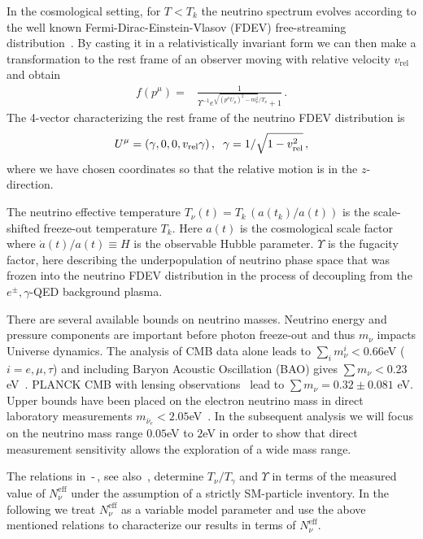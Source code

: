 In the cosmological setting, for $T<T_k$ the neutrino spectrum evolves according to the well known Fermi-Dirac-Einstein-Vlasov (FDEV) free-streaming distribution~\cite{Langacker:1982ih,Choquet-Bruhat:2009xil,Wong:2011ip,Birrell:2012gg}.  By casting it in a relativistically invariant form we can then make a transformation to the rest frame of an observer moving with relative velocity $v_{\text{rel}}$ and obtain
\begin{align}\label{eq:neutrinoDistB}
f(p^\mu)=&\frac{1}{\Upsilon^{-1} e^{\sqrt{(p^\mu U_\mu)^2-m_\nu^2}/T_\nu}+1}\,.
\end{align}
The 4-vector characterizing the rest frame of the neutrino FDEV distribution is
\begin{equation}
U^\mu=(\gamma,0,0,v_{\text{rel}}\gamma)\,,\hspace{2mm} \gamma={1}/{\sqrt{1-v_{\text{rel}}^2}}\,,
\end{equation} 
where we have chosen coordinates so that the relative motion is in the $z$-direction. 

The neutrino effective temperature $T_\nu(t)= T_k\,(a(t_k)/a(t))$ is the scale-shifted freeze-out temperature $T_k$. Here $a(t)$ is the cosmological scale factor where $\dot a(t)/a(t)\equiv H$ is the observable Hubble parameter. $\Upsilon$ is the fugacity factor, here describing the underpopulation of neutrino phase space that was frozen into the neutrino FDEV distribution in the process of decoupling from the $e^\pm,\gamma$-QED background  plasma.

There are several available bounds on neutrino masses. Neutrino energy and pressure components are important before photon freeze-out and thus $m_\nu$ impacts Universe dynamics. The analysis of CMB data alone leads to $\sum_i m_\nu^i<0.66$eV ($i=e,\mu,\tau$) and including Baryon Acoustic Oscillation (BAO) gives $\sum m_\nu<0.23$eV~\cite{Planck:2013pxb}.  {\small PLANCK CMB} with lensing observations~\cite{Battye:2013xqa} lead to  $\sum m_{\nu}=0.32\pm0.081$ eV. Upper bounds have been placed on the electron neutrino mass in direct laboratory measurements  $m_{\bar\nu_e}<2.05$eV~\cite{Troitsk:2011cvm}.   In the subsequent analysis we will focus on the neutrino mass range $0.05$eV to $2$eV in order to show that direct measurement sensitivity allows the exploration of a wide mass range. 

 The relations in \,-\,, see also~\cite{Birrell:2012gg}, determine $T_\nu/T_\gamma$ and  $\Upsilon$ in terms of the measured  value of  $N_\nu^{\mathrm{eff}}$ under the assumption of a strictly SM-particle inventory.  In the following we treat $N_\nu^{\mathrm{eff}}$  as a variable model parameter and use the above mentioned relations to characterize our results in terms of $N_\nu^{\mathrm{eff}}$.


